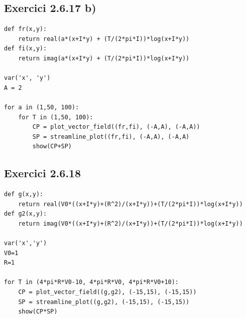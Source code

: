 \documentclass[a4paper, 11pt]{article}
\begin{document}
\subsection{Exercici 2.6.17 b)}
\hline
\begin{lstlisting}
def fr(x,y):
    return real(a*(x+I*y) + (T/(2*pi*I))*log(x+I*y))
def fi(x,y):
    return imag(a*(x+I*y) + (T/(2*pi*I))*log(x+I*y))
    
var('x', 'y')
A = 2 

for a in (1,50, 100):
    for T in (1,50, 100):
        CP = plot_vector_field((fr,fi), (-A,A), (-A,A))
        SP = streamline_plot((fr,fi), (-A,A), (-A,A)
        show(CP+SP)
\end{lstlisting}\label{c17}
\hline
\newpage
\subsection{Exercici 2.6.18}
\hline
\begin{lstlisting}
def g(x,y):
    return real(V0*((x+I*y)+(R^2)/(x+I*y))+(T/(2*pi*I))*log(x+I*y))
def g2(x,y):
    return imag(V0*((x+I*y)+(R^2)/(x+I*y))+(T/(2*pi*I))*log(x+I*y))
    
var('x','y')
V0=1
R=1

for T in (4*pi*R*V0-10, 4*pi*R*V0, 4*pi*R*V0+10):
    CP = plot_vector_field((g,g2), (-15,15), (-15,15))
    SP = streamline_plot((g,g2), (-15,15), (-15,15))
    show(CP*SP)
\end{lstlisting}\label{c18}
\hline
\end{document}

